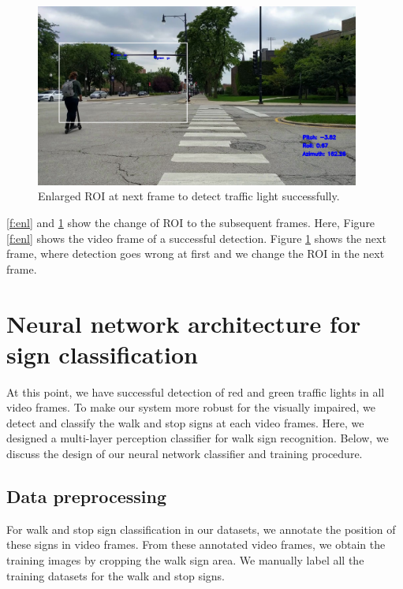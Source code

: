\begin{figure}[!ht]
  \centering
  \includegraphics[width=4.2in]{images/rec_enl1.jpg}
  \caption{Enlarged ROI at next frame to detect traffic light successfully.}
  \label{f:enl1}
\end{figure}

\ref{f:enl} and \ref{f:enl1} show the change of ROI to the subsequent frames.
Here, Figure \ref{f:enl} shows the video frame of a successful detection.
Figure \ref{f:enl1} shows the next frame, where detection goes wrong at first and we change the ROI in the next frame.

\section{Neural network architecture for sign classification}
At this point, we have successful detection of red and green traffic lights in all video frames.
To make our system more robust for the visually impaired, we detect and classify the walk and stop signs at each video frames.
Here, we designed a multi-layer perception classifier for walk sign recognition.
Below, we discuss the design of our neural network classifier and training procedure. 

\subsection{Data preprocessing}
\label{s:prepro}
For walk and stop sign classification in our datasets, we annotate the position of these signs in video frames.
From these annotated video frames, we obtain the training images by cropping the walk sign area.
We manually label all the training datasets for the walk and stop signs.

